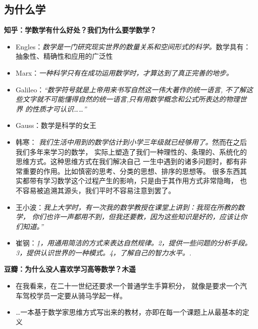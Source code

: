 \subsection{为什么学}

\begin{shaded}
	{\bf 知乎：学数学有什么好处？我们为什么要学数学？}
	\begin{itemize}
	  \item Engles：{\it 数学是一门研究现实世界的数量关系和空间形式的科学。}数学具有：
	  抽象性、精确性和应用的广泛性
	  \item Marx：{\it 一种科学只有在成功运用数学时，才算达到了真正完善的地步。}
	  \item Galileo：{\it “数学符号就是上帝用来书写自然这一伟大著作的统一语言,
	  不了解这些文字就不可能懂得自然的统一语言,只有用数学概念和公式所表达的物理世界
	  的性质才可认识……”}
	  \item Gauss：{数学是科学的女王}
	  \item 韩寒：{\it
	  我们生活中用到的数学估计到小学三年级就已经够用了。}然而在之后我们多年来学习的数学，
	  实际上塑造了我们一种理性的、条理的、系统化的思维方式。这种思维方式在我们解决自己
	  一生中遇到的诸多问题时，都有非常重要的作用。比如慎密的思考、分类的思想、排序的思想等。
	  很多东西其实都带有学习数学这个过程产生的影响，只是由于其作用方式非常隐晦，
	  也不容易被追溯其源头，我们平时不容易注意到罢了。
	  \item 王小波：{\it 我上大学时，有一次我的数学教授在课堂上讲到：我现在所教的数学，
	  你们也许一声都用不到，但我还要教，因为这些知识是好的，应该让你们知道。”}
	  \item 崔钢：{\it\b 1，用通用简洁的方式来表达自然规律。2，提供一些问题的分析手段。
	  3，提供认识世界的一种模式。4，了解自己的智力水平。.}
	\end{itemize}
	{\bf 豆瓣：为什么没人喜欢学习高等数学？木遥}
	\begin{itemize}
	  \item 在我看来，在二十一世纪还要求一个普通学生手算积分，
	  就像是要求一个汽车驾校学员一定要从骑马学起一样。
	  \item \ldots 一本基于数学家思维方式写出来的教材，亦即在每一个课题上从最基本的定义

\end{itemize}
\end{shaded}

